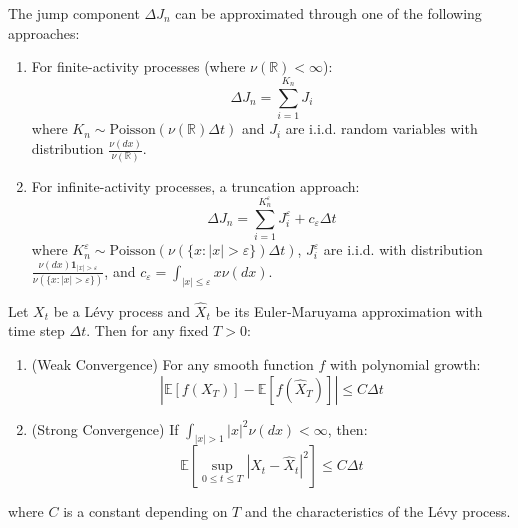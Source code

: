     \begin{proposition}
        The jump component $\Delta J_n$ can be approximated through one of the following approaches:
        \begin{enumerate}
            \item For finite-activity processes (where $\nu(\mathbb{R}) < \infty$):
                  \begin{equation}
                      \Delta J_n = \sum_{i=1}^{K_n} J_i
                  \end{equation}
                  where $K_n \sim \text{Poisson}(\nu(\mathbb{R})\Delta t)$ and $J_i$ are i.i.d. random variables with distribution $\frac{\nu(dx)}{\nu(\mathbb{R})}$.

            \item For infinite-activity processes, a truncation approach:
                  \begin{equation}
                      \Delta J_n = \sum_{i=1}^{K^{\varepsilon}_n} J^{\varepsilon}_i + c_{\varepsilon}\Delta t
                  \end{equation}
                  where $K^{\varepsilon}_n \sim \text{Poisson}(\nu(\{x: |x| > \varepsilon\})\Delta t)$, $J^{\varepsilon}_i$ are i.i.d. with distribution $\frac{\nu(dx)\mathbf{1}_{|x|>\varepsilon}}{\nu(\{x: |x| > \varepsilon\})}$, and $c_{\varepsilon} = \int_{|x|\leq\varepsilon} x\nu(dx)$.
        \end{enumerate}
    \end{proposition}
\fi
\begin{theorem}
    \label{thm:euler_maruyama_convergence}
    Let $X_t$ be a Lévy process and $\hat{X}_t$ be its Euler-Maruyama approximation with time step $\Delta t$. Then for any fixed $T > 0$:
    \begin{enumerate}
        \item (Weak Convergence) For any smooth function $f$ with polynomial growth:
              \begin{equation}
                  |\mathbb{E}[f(X_T)] - \mathbb{E}[f(\hat{X}_T)]| \leq C\Delta t
              \end{equation}

        \item (Strong Convergence) If $\int_{|x|>1} |x|^2 \nu(dx) < \infty$, then:
              \begin{equation}
                  \mathbb{E}[\sup_{0\leq t\leq T} |X_t - \hat{X}_t|^2] \leq C\Delta t
              \end{equation}
    \end{enumerate}
    where $C$ is a constant depending on $T$ and the characteristics of the Lévy process.

\end{theorem}

